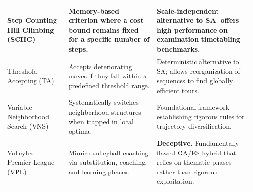 \begin{center}
\begin{longtable}{
  >{\raggedright\arraybackslash}p{}
  >{\raggedright\arraybackslash}p{}
  >{\raggedright\arraybackslash}p{}
}
Step Counting Hill Climbing (SCHC) & Memory-based criterion where a cost bound remains fixed for a specific number of steps. & Scale-independent alternative to SA; offers high performance on examination timetabling benchmarks. \\ \midrule

Threshold Accepting (TA) & Accepts deteriorating moves if they fall within a predefined threshold range. & Deterministic alternative to SA; allows reorganization of sequences to find globally efficient tours. \\ \midrule

Variable Neighborhood Search (VNS) & Systematically switches neighborhood structures when trapped in local optima. & Foundational framework establishing rigorous rules for trajectory diversification. \\ \midrule

Volleyball Premier League (VPL) & Mimics volleyball coaching via substitution, coaching, and learning phases. & \textbf{Deceptive.} Fundamentally flawed GA/ES hybrid that relies on thematic phases rather than rigorous exploitation. \\ \bottomrule
\end{longtable}
\end{center}
